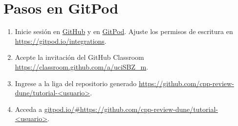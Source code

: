 \documentclass[9pt,a3paper]{scrartcl}
\begin{document}
\section*{\Huge Pasos en GitPod}

\begin{enumerate}
	\item Inicie sesión en \href{https://github.com/login}{GitHub} y en \href{https://gitpod.io/login}{GitPod}. Ajuste los permisos de escritura en \url{https://gitpod.io/integrations}.

	\item Acepte la invitación del GitHub Classroom \url{https://classroom.github.com/a/uciSBZ_m}.

	\item Ingrese a la liga del repositorio generado \url{https://github.com/cpp-review-dune/tutorial-<usuario>}.

	\item Acceda a \url{gitpod.io/#https://github.com/cpp-review-dune/tutorial-<usuario>}.
\end{enumerate}

\vfill

\end{document}
